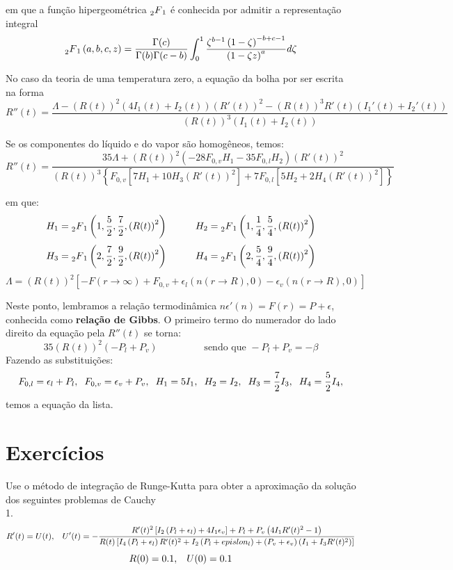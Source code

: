 \documentclass[10pt,a4paper]{article}
\newcommand{\prt}[1]{\left(#1\right)}
\newcommand{\col}[1]{\left[#1\right]}
\newcommand{\chv}[1]{\left\{#1\right\}}
\newcommand{\hgf}[4]{\prescript{}{2}{F}_1\left(#1,#2,#3,#4\right)}
\begin{document}
	em que a função hipergeométrica $\prescript{}{2}{F}_1$ é conhecida por admitir a representação integral
	\[\hgf{a}{b}{c}{z} = \frac{\Gamma(c)}{\Gamma(b)\Gamma(c-b)}\int_0^1{\frac{\zeta^{b-1}\prt{1-\zeta}^{-b+c-1}}{\prt{1-\zeta z}^a}d\zeta}\]
	
	No caso da teoria de uma temperatura zero, a equação da bolha por ser escrita na forma
	\[R''(t) = \frac{\Lambda-\prt{R(t)}^2\prt{4I_1(t)+I_2(t)}\prt{R'(t)}^2-\prt{R(t)}^3R'(t)\prt{I_1'(t)+I_2'(t)}}{\prt{R(t)}^3\prt{I_1(t)+I_2(t)}}\]
	
	Se os componentes do líquido e do vapor são homogêneos, temos:
	\[R''(t) = \frac{35\Lambda + \prt{R(t)}^2\prt{-28F_{0,v}H_1-35F_{0,l}H_2}\prt{R'(t)}^2}{\prt{R(t)}^3\chv{F_{0,v}\col{7H_1+10H_3\prt{R'(t)}^2}+7F_{0,l}\col{5H_2+2H_4\prt{R'(t)}^2}}}\]
	
	em que:
	\[H_1 = \hgf{1}{\frac{5}{2}}{\frac{7}{2}}{\prt{R(t)}^2} \hspace{1cm} H_2 = \hgf{1}{\frac{1}{4}}{\frac{5}{4}}{\prt{R(t)}^2}\]
	\[H_3 = \hgf{2}{\frac{7}{2}}{\frac{9}{2}}{\prt{R(t)}^2} \hspace{1cm} H_4 = \hgf{2}{\frac{5}{4}}{\frac{9}{4}}{\prt{R(t)}^2}\]
	\[\Lambda = \prt{R(t)}^2\col{-F(r\rightarrow\infty) + F_{0,v} + \epsilon_l(n(r\rightarrow R),0) - \epsilon_v(n(r\rightarrow R),0)}\]
	
	Neste ponto, lembramos a relação termodinâmica $n\epsilon'(n)=F(r)=P+\epsilon$, conhecida como \textbf{relação de Gibbs}. O primeiro termo do numerador do lado direito da equação pela $R''(t)$ se torna:
	\[35\prt{R(t)}^2\prt{-P_l+P_v}\hspace{2cm}\mbox{sendo que }-P_l+P_v=-\beta\]
	Fazendo as substituições:
	\[F_{0,l}=\epsilon_l+P_l, \hspace{.2cm} F_{0,v}=\epsilon_v+P_v, \hspace{.2cm} H_1=5I_1, \hspace{.2cm} H_2=I_2, \hspace{.2cm} H_3=\frac{7}{2}I_3,\hspace{.2cm}  H_4=\frac{5}{2}I_4,\]
	temos a equação da lista.
	
	\section{Exercícios}
	Use o método de integração de Runge-Kutta para obter a aproximação da solução dos seguintes problemas de Cauchy\\
	
	1. \[R'(t)=U(t), \hspace{0.3cm} U'(t)=-\frac{R'(t)^2\col{I_2\prt{P_l+\epsilon_l} + 4I_1\epsilon_v}+P_l+P_v\prt{4I_1R'(t)^2-1}}{R(t)\col{I_4\prt{P_l+\epsilon_l}R'(t)^2+I_2\prt{P_l+epislon_l}+\prt{P_v+\epsilon_v}\prt{I_1+I_3R'(t)^2}}}\]
	\[R(0)=0.1, \hspace{.3cm} U(0)=0.1\]
	
\end{document}
